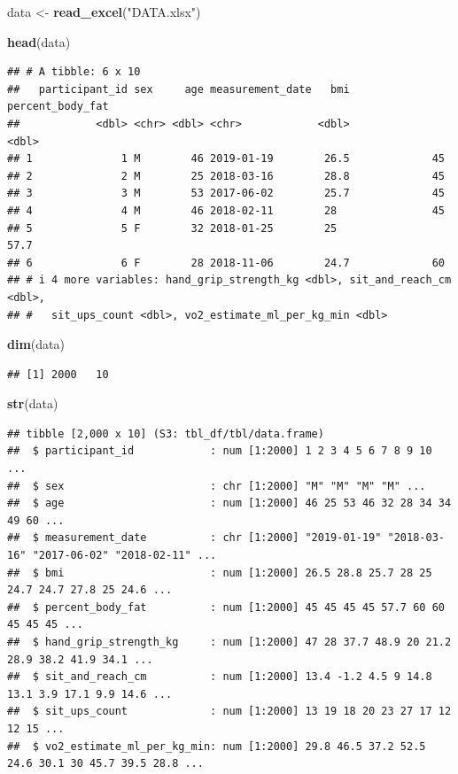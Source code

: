 \documentclass[
]{article}
\newenvironment{Shaded}{\begin{snugshade}}{\end{snugshade}}
\newcommand{\FunctionTok}[1]{\textcolor[rgb]{0.13,0.29,0.53}{\textbf{#1}}}
\newcommand{\NormalTok}[1]{#1}
\newcommand{\OtherTok}[1]{\textcolor[rgb]{0.56,0.35,0.01}{#1}}
\newcommand{\StringTok}[1]{\textcolor[rgb]{0.31,0.60,0.02}{#1}}
\begin{document}
\begin{Shaded}
\begin{Highlighting}[]
\NormalTok{data }\OtherTok{\textless{}{-}} \FunctionTok{read\_excel}\NormalTok{(}\StringTok{"DATA.xlsx"}\NormalTok{)}

\FunctionTok{head}\NormalTok{(data)}
\end{Highlighting}
\end{Shaded}

\begin{verbatim}
## # A tibble: 6 x 10
##   participant_id sex     age measurement_date   bmi percent_body_fat
##            <dbl> <chr> <dbl> <chr>            <dbl>            <dbl>
## 1              1 M        46 2019-01-19        26.5             45  
## 2              2 M        25 2018-03-16        28.8             45  
## 3              3 M        53 2017-06-02        25.7             45  
## 4              4 M        46 2018-02-11        28               45  
## 5              5 F        32 2018-01-25        25               57.7
## 6              6 F        28 2018-11-06        24.7             60  
## # i 4 more variables: hand_grip_strength_kg <dbl>, sit_and_reach_cm <dbl>,
## #   sit_ups_count <dbl>, vo2_estimate_ml_per_kg_min <dbl>
\end{verbatim}

\begin{Shaded}
\begin{Highlighting}[]
\FunctionTok{dim}\NormalTok{(data)}
\end{Highlighting}
\end{Shaded}

\begin{verbatim}
## [1] 2000   10
\end{verbatim}

\begin{Shaded}
\begin{Highlighting}[]
\FunctionTok{str}\NormalTok{(data)}
\end{Highlighting}
\end{Shaded}

\begin{verbatim}
## tibble [2,000 x 10] (S3: tbl_df/tbl/data.frame)
##  $ participant_id            : num [1:2000] 1 2 3 4 5 6 7 8 9 10 ...
##  $ sex                       : chr [1:2000] "M" "M" "M" "M" ...
##  $ age                       : num [1:2000] 46 25 53 46 32 28 34 34 49 60 ...
##  $ measurement_date          : chr [1:2000] "2019-01-19" "2018-03-16" "2017-06-02" "2018-02-11" ...
##  $ bmi                       : num [1:2000] 26.5 28.8 25.7 28 25 24.7 24.7 27.8 25 24.6 ...
##  $ percent_body_fat          : num [1:2000] 45 45 45 45 57.7 60 60 45 45 45 ...
##  $ hand_grip_strength_kg     : num [1:2000] 47 28 37.7 48.9 20 21.2 28.9 38.2 41.9 34.1 ...
##  $ sit_and_reach_cm          : num [1:2000] 13.4 -1.2 4.5 9 14.8 13.1 3.9 17.1 9.9 14.6 ...
##  $ sit_ups_count             : num [1:2000] 13 19 18 20 23 27 17 12 12 15 ...
##  $ vo2_estimate_ml_per_kg_min: num [1:2000] 29.8 46.5 37.2 52.5 24.6 30.1 30 45.7 39.5 28.8 ...
\end{verbatim}
\end{document}
